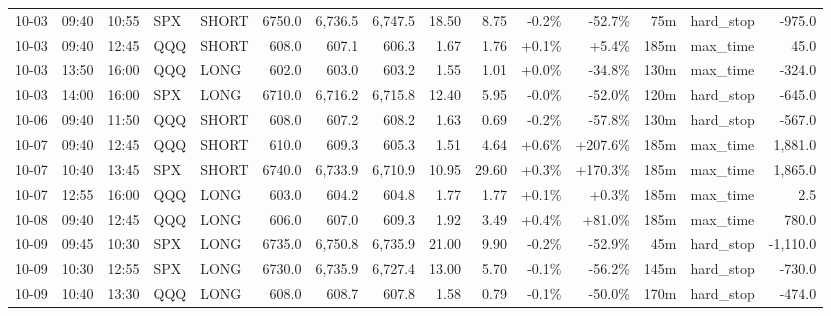\documentclass[11pt,a4paper,twoside]{article}
\begin{document}
\begin{landscape}
\begin{center}
\begin{longtable}{>{\color{txtmain}}l l l l l r r r r r r r r >{\color{txtmain}}l r}
10-03 & 09:40 & 10:55 & SPX & SHORT & 6750.0 & 6,736.5 & 6,747.5 & 18.50 & 8.75 & \textcolor{lossred}{-0.2\%} & \textcolor{lossred}{-52.7\%} & 75m & hard\_stop & \textcolor{lossred}{-975.0} \\
10-03 & 09:40 & 12:45 & QQQ & SHORT & 608.0 & 607.1 & 606.3 & 1.67 & 1.76 & \textcolor{wingreen}{+0.1\%} & \textcolor{wingreen}{+5.4\%} & 185m & max\_time & \textcolor{wingreen}{45.0} \\
10-03 & 13:50 & 16:00 & QQQ & LONG & 602.0 & 603.0 & 603.2 & 1.55 & 1.01 & \textcolor{wingreen}{+0.0\%} & \textcolor{lossred}{-34.8\%} & 130m & max\_time & \textcolor{lossred}{-324.0} \\
10-03 & 14:00 & 16:00 & SPX & LONG & 6710.0 & 6,716.2 & 6,715.8 & 12.40 & 5.95 & \textcolor{lossred}{-0.0\%} & \textcolor{lossred}{-52.0\%} & 120m & hard\_stop & \textcolor{lossred}{-645.0} \\
10-06 & 09:40 & 11:50 & QQQ & SHORT & 608.0 & 607.2 & 608.2 & 1.63 & 0.69 & \textcolor{lossred}{-0.2\%} & \textcolor{lossred}{-57.8\%} & 130m & hard\_stop & \textcolor{lossred}{-567.0} \\
10-07 & 09:40 & 12:45 & QQQ & SHORT & 610.0 & 609.3 & 605.3 & 1.51 & 4.64 & \textcolor{wingreen}{+0.6\%} & \textcolor{wingreen}{+207.6\%} & 185m & max\_time & \textcolor{wingreen}{1,881.0} \\
10-07 & 10:40 & 13:45 & SPX & SHORT & 6740.0 & 6,733.9 & 6,710.9 & 10.95 & 29.60 & \textcolor{wingreen}{+0.3\%} & \textcolor{wingreen}{+170.3\%} & 185m & max\_time & \textcolor{wingreen}{1,865.0} \\
10-07 & 12:55 & 16:00 & QQQ & LONG & 603.0 & 604.2 & 604.8 & 1.77 & 1.77 & \textcolor{wingreen}{+0.1\%} & \textcolor{wingreen}{+0.3\%} & 185m & max\_time & \textcolor{wingreen}{2.5} \\
10-08 & 09:40 & 12:45 & QQQ & LONG & 606.0 & 607.0 & 609.3 & 1.92 & 3.49 & \textcolor{wingreen}{+0.4\%} & \textcolor{wingreen}{+81.0\%} & 185m & max\_time & \textcolor{wingreen}{780.0} \\
10-09 & 09:45 & 10:30 & SPX & LONG & 6735.0 & 6,750.8 & 6,735.9 & 21.00 & 9.90 & \textcolor{lossred}{-0.2\%} & \textcolor{lossred}{-52.9\%} & 45m & hard\_stop & \textcolor{lossred}{-1,110.0} \\
10-09 & 10:30 & 12:55 & SPX & LONG & 6730.0 & 6,735.9 & 6,727.4 & 13.00 & 5.70 & \textcolor{lossred}{-0.1\%} & \textcolor{lossred}{-56.2\%} & 145m & hard\_stop & \textcolor{lossred}{-730.0} \\
10-09 & 10:40 & 13:30 & QQQ & LONG & 608.0 & 608.7 & 607.8 & 1.58 & 0.79 & \textcolor{lossred}{-0.1\%} & \textcolor{lossred}{-50.0\%} & 170m & hard\_stop & \textcolor{lossred}{-474.0} \\

\end{longtable}
\end{center}
\end{landscape}
\end{document}
